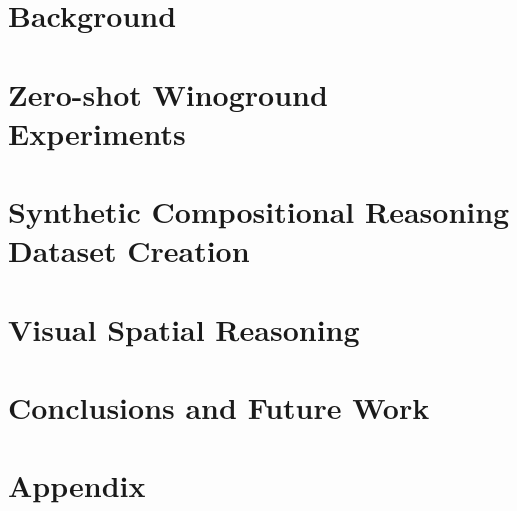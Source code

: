 \documentclass[a4paper, 11pt]{memoir}
\begin{document}
\chapter{Background} \label{cha:2_background}

\cleardoublepage

\chapter{Zero-shot Winoground Experiments} \label{cha:4_winoground}

\cleardoublepage

\chapter{Synthetic Compositional Reasoning Dataset Creation} \label{cha:5_experiments}

\cleardoublepage

\chapter{Visual Spatial Reasoning} \label{cha:6_visual_spatial_reasoning}

\cleardoublepage

\chapter{Conclusions and Future Work} \label{cha:7_conclusions_future_work}

\cleardoublepage


\backmatter
\appendix

\chapter{Appendix} \label{cha:appendix}




\end{document}
